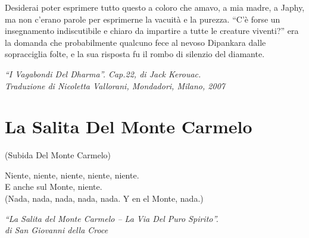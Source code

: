 Desiderai poter esprimere tutto questo a coloro che amavo, a mia madre,
a Japhy, ma non c'erano parole per esprimerne la vacuità e la purezza.
``C'è forse un insegnamento indiscutibile e chiaro da impartire a tutte
le creature viventi?'' era la domanda che probabilmente qualcuno fece al
nevoso Dipankara dalle sopracciglia folte, e la sua risposta fu il rombo
di silenzio del diamante.

{\small\itshape
  ``I Vagabondi Del Dharma''. Cap.22, di Jack Kerouac.\\
  Traduzione di Nicoletta Vallorani, Mondadori, Milano, 2007
}

\clearpage

\section*{La Salita Del Monte Carmelo}

(Subida Del Monte Carmelo)

Niente, niente, niente, niente, niente.\\
E anche sul Monte, niente.\\
(Nada, nada, nada, nada, nada. Y en el Monte, nada.)

{\small\itshape
  ``La Salita del Monte Carmelo -- La Via Del Puro Spirito''.\\
  di San Giovanni della Croce
}

\setlength{\parskip}{0pt}
\setlength{\parindent}{17pt}
